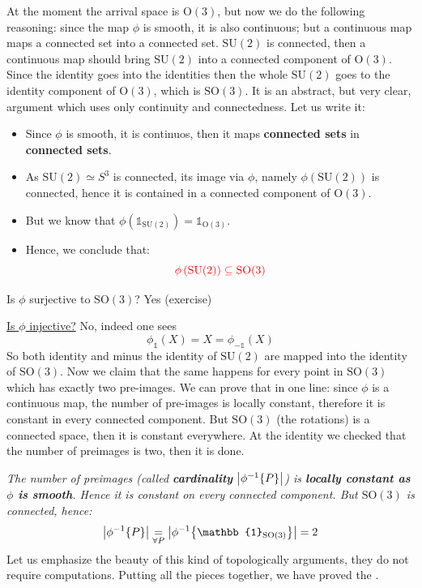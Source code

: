 \documentclass[../main.tex]{subfiles}
\begin{document}
At the moment the arrival space is $\textrm{O}(3)$, but now we do the following reasoning: since the map $\phi$ is smooth, it is also continuous; but a continuous map maps a connected set into a connected set. $\textrm{SU}(2)$ is connected, then a continuous map should bring $\textrm{SU}(2)$ into a connected component of $\textrm{O}(3)$. Since the identity goes into the identities then the whole $\textrm{SU}(2)$ goes to the identity component of $\textrm{O}(3)$, which is $\textrm{SO}(3)$. It is an abstract, but very clear, argument which uses only continuity and connectedness. Let us write it:
\begin{itemize}
    \item Since $\phi$ is smooth, it is continuos, then it maps \textbf{connected sets} in \textbf{connected sets}.
    \item As $\textrm{SU}(2)\simeq S^3$ is connected, its image via $\phi$, namely $\phi\left(\textrm{SU}(2)\right)$ is connected, hence it is contained in a connected component of $\textrm{O}(3)$.
    \item But we know that $\phi\left(\mathbb{1}_{\textrm{SU}(2)}\right)=\mathbb{1}_{\textrm{O}(3)}$.
    \item Hence, we conclude that:
    \[
    {\color{red}\phi\left(\textrm{SU}(2)\right)\subseteq\textrm{SO(3)}}
    \]
\end{itemize}
\begin{exercise}
Is $\phi$ surjective to $\textrm{SO}(3)$? Yes (exercise)
\end{exercise}
\underline{Is $\phi$ injective?} No, indeed one sees 
\[
\phi_{\mathbb{1}}(X)=X=\phi_{-\mathbb{1}}(X)
\]
So both identity and minus the identity of $\textrm{SU}(2)$ are mapped into the identity of $\textrm{SO}(3)$. Now we claim that the same happens for every point in $\textrm{SO}(3)$ which has exactly two pre-images. We can prove that in one line: since $\phi$ is a continuous map, the number of pre-images is locally constant, therefore it is constant in every connected component. But $\textrm{SO}(3)$ (the rotations) is a connected space, then it is constant everywhere. At the identity we checked that the number of preimages is two, then it is done.

\textit{The number of preimages (called \textbf{cardinality} $\abs{\phi^{-1}\Bqty{P}}$) is \textbf{locally constant as $\phi$ is smooth}. Hence it is constant on every connected component. But $\textrm{SO}(3)$ is connected, hence:
\[
\abs{\phi^{-1}\Bqty{P}}\underset{\forall P}{=}\abs{\phi^{-1}\Bqty{\mathbb{1}_{\textrm{SO}(3)}}}=2
\]}
Let us emphasize the beauty of this kind of topologically arguments, they do not require computations. Putting all the pieces together, we have proved the .
\end{document}

